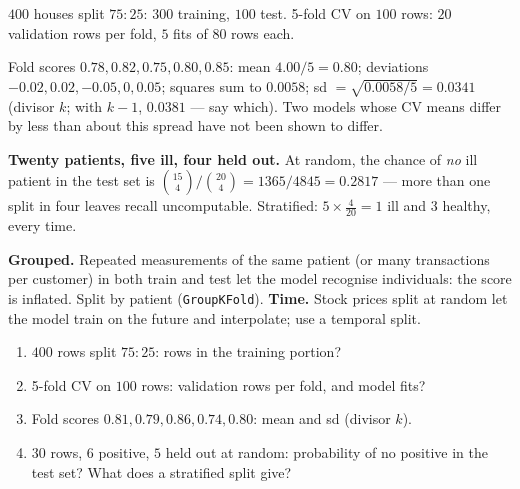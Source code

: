 \documentclass[11pt]{article}
\begin{document}
\begin{worked}
$400$ houses split $75{:}25$: $300$ training, $100$ test. 5-fold CV on $100$
rows: $20$ validation rows per fold, $5$ fits of $80$ rows each.

Fold scores $0.78, 0.82, 0.75, 0.80, 0.85$: mean $4.00/5 = 0.80$; deviations
$-0.02, 0.02, -0.05, 0, 0.05$; squares sum to $0.0058$; sd $=
\sqrt{0.0058/5} = 0.0341$ (divisor $k$; with $k - 1$, $0.0381$ --- say which).
Two models whose CV means differ by less than about this spread have not been
shown to differ.
\end{worked}

\begin{worked}
\textbf{Twenty patients, five ill, four held out.} At random, the chance of
\emph{no} ill patient in the test set is
$\binom{15}{4}/\binom{20}{4} = 1365/4845 = 0.2817$ --- more than one split in
four leaves recall uncomputable. Stratified: $5 \times \tfrac{4}{20} = 1$ ill
and $3$ healthy, every time.

\textbf{Grouped.} Repeated measurements of the same patient (or many
transactions per customer) in both train and test let the model recognise
individuals: the score is inflated. Split by patient (\texttt{GroupKFold}).
\textbf{Time.} Stock prices split at random let the model train on the future
and interpolate; use a temporal split.
\end{worked}

\begin{tryit}
\begin{enumerate}[label=\textbf{E14.\arabic*}]
  \item $400$ rows split $75{:}25$: rows in the training portion?
  \item 5-fold CV on $100$ rows: validation rows per fold, and model fits?
  \item Fold scores $0.81, 0.79, 0.86, 0.74, 0.80$: mean and sd (divisor $k$).
  \item $30$ rows, $6$ positive, $5$ held out at random: probability of no
    positive in the test set? What does a stratified split give?
\end{enumerate}
\end{tryit}
\end{document}
